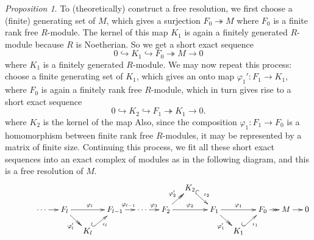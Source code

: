 \documentclass{article}
\renewcommand{\to}{\ensuremath{\rightarrow}}
\newcommand{\onto}{\ensuremath{\twoheadrightarrow}}
\newcommand{\into}{\ensuremath{\hookrightarrow}}
\theoremstyle{definition}
\theoremstyle{remark}
\theoremstyle{example}
\newtheorem{prop}{Proposition}[section]
\begin{document}
\begin{prop}
    To (theoretically) construct a free resolution, we first choose a (finite) generating set of $M$, which gives a surjection $F_0 \onto M$ where $F_0$ is a finite rank free $R$-module. The kernel of this map $K_1$ is again a finitely generated $R$-module because $R$ is Noetherian. So we get a short exact sequence 
    \begin{equation}
        0 \into K_1 \into F_0 \onto M \to 0
    \end{equation}
    where $K_1$ is a finitely generated $R$-module.  We may now repeat this process: choose a finite generating set of $K_1$, which gives an onto map $\varphi_1': F_1 \to K_1$, where $F_0$ is again a finitely rank free $R$-module, which in turn gives rise to a short exact sequence
    \begin{equation}
        0 \into K_2 \into F_1 \onto K_1 \to 0.
    \end{equation}
    where $K_2$ is the kernel of the map Also, since the composition $\varphi_1: F_1 \to F_0$ is a homomorphism between finite rank free $R$-modules, it may be represented by a matrix of finite size. Continuing this process, we fit all these short exact sequences into an exact complex of modules as in the following diagram, and this is a free resolution of $M$.
    \begin{equation}
        \xymatrix@C=1pc@R=1pc{
            &            &       &       &       &      &       &     &K_2 \ar@{^{(}->}[dr]^{\iota_2}\\
            &       &\cdots \ar[r]       &F_{l} \ar@{->>}[dr]_{\varphi_{l}'} \ar[rr]^{\varphi_{l}}&       &F_{l-1} \ar[r]^{\varphi_{l-1}}&\cdots \ar[r]^{\varphi_3}&F_2 \ar@{->>}[ur]^{\varphi_2'} \ar[rr]^{\varphi_2}&       &F_1 \ar@{->>}[dr]_{\varphi_1'} \ar[rr]^{\varphi_1} &         &  F_0 \ar@{->>}[r] & M \ar[r] & 0\\
            &        &       &       & K_{l} \ar@{^{(}->}[ur]_{\iota_{l}}        &        &        &      &       &       & K_1 \ar@{^{(}->}[ur]_{\iota_1}  &       &       & \\
        }
\end{equation}
\end{prop}
\end{document}
